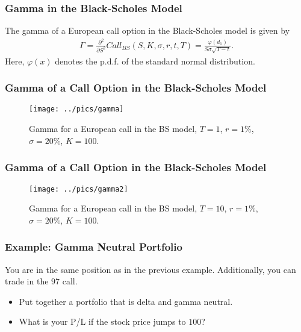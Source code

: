 \begin{frame}[fragile]
\frametitle{Gamma in the Black-Scholes Model}
The gamma of a European call option in the Black-Scholes model is given by
\begin{align*}
  \Gamma = \frac{\partial^2}{\partial S^2}Call_{BS}(S,K,\sigma,r,t,T) =
  \frac{\varphi(d_1)}{S\sigma \sqrt{T-t}}.
\end{align*}
Here, $\varphi(x)$ denotes the p.d.f. of the standard normal distribution.
\end{frame}

\begin{frame}[fragile]
\frametitle{Gamma of a Call Option in the Black-Scholes Model}
\begin{figure}[htp]
\begin{center}
  \texttt{[image: ../pics/gamma]}
  \caption{Gamma for a European call in the BS model, $T=1$, $r=1\%$,
  $\sigma=20\%$, $K=100$.}
  \label{fig:gammaBS}
\end{center}
\end{figure}
\end{frame}

\begin{frame}[fragile]
\frametitle{Gamma of a Call Option in the Black-Scholes Model}
\begin{figure}[htp]
\begin{center}
  \texttt{[image: ../pics/gamma2]}
  \caption{Gamma for a European call in the BS model, $T=10$, $r=1\%$,
  $\sigma=20\%$, $K=100$.}
  \label{fig:gamma2BS}
\end{center}
\end{figure}
\end{frame}

\begin{frame}[fragile]
\frametitle{Example: Gamma Neutral Portfolio}
You are in the same position as in the previous example. Additionally, you can
trade in the $97$ call.
\begin{itemize}
  \item Put together a portfolio that is delta and gamma neutral.
  \item What is your P/L if the stock price jumps to $100$?
\end{itemize}
\end{frame}

